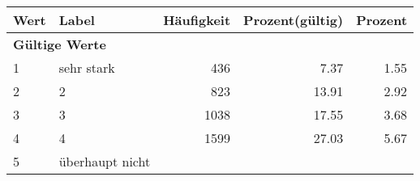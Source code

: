      \begin{longtable}{lXrrr}
     \toprule
     \textbf{Wert} & \textbf{Label} & \textbf{Häufigkeit} & \textbf{Prozent(gültig)} & \textbf{Prozent} \\
     \endhead
     \midrule
     \multicolumn{5}{l}{\textbf{Gültige Werte}}\\

     1 &
     \multicolumn{1}{X}{ sehr stark   } &


       \num{436} &
       \num[round-mode=places,round-precision=2]{7.37} &
         \num[round-mode=places,round-precision=2]{1.55} \\

     2 &
     \multicolumn{1}{X}{ 2   } &


       \num{823} &
       \num[round-mode=places,round-precision=2]{13.91} &
         \num[round-mode=places,round-precision=2]{2.92} \\

     3 &
     \multicolumn{1}{X}{ 3   } &


       \num{1038} &
       \num[round-mode=places,round-precision=2]{17.55} &
         \num[round-mode=places,round-precision=2]{3.68} \\

     4 &
     \multicolumn{1}{X}{ 4   } &


       \num{1599} &
       \num[round-mode=places,round-precision=2]{27.03} &
         \num[round-mode=places,round-precision=2]{5.67} \\

     5 &
     \multicolumn{1}{X}{ überhaupt nicht   } &



\end{longtable}
